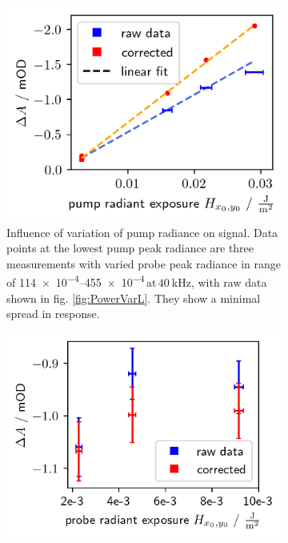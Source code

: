 \documentclass[twoside,openright]{scrreprt}
\def\frep#1{\ensuremath{\,\mathrm{at}\, \SI{#1}{\kilo\hertz}}}
\begin{document}
\begin{figure}[hbtp]
\begin{subfigure}[t]{0.5\linewidth}
\centering
\includegraphics[width=\linewidth]{images/PowerVariationCorrectedPump.png}
\caption{Influence of variation of pump radiance on signal. Data points at the lowest pump peak radiance are three measurements with varied probe peak radiance in range of \SIrange{114e-4}{455e-4}{\radExp}\frep{40}, with raw data shown in fig. \ref{fig:PowerVarL}. They show a minimal spread in response.}
\end{subfigure}\hfill
\begin{subfigure}[t]{0.5\linewidth}
\centering
\includegraphics[width=\linewidth]{images/PowerVariationCorrectedProbe.png}

\end{subfigure}
\end{figure}
\end{document}
